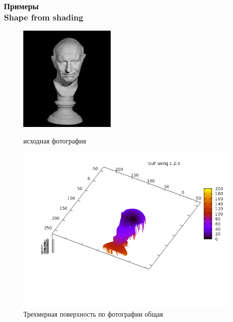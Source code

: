 \documentclass[hyperref={unicode=true},professionalfont]{beamer}
\newcommand{\stamp}{
	\begin{frame}[plain,noframenumbering]
		\begin{table}[h!]
			\flushright
			\vspace{5cm}
			\begin{adjustbox}{max width=0.7\textwidth}
				\begin{tabular}{
					|>{\footnotesize}p{0.8cm}|
					>{\footnotesize}p{0.8cm}|
					>{\footnotesize}p{2.2cm}|
					>{\footnotesize}p{1.1cm}|
					>{\footnotesize}p{0.8cm}|
					>{\footnotesize}p{5cm}|
					>{\footnotesize}p{0.1cm}|
					>{\footnotesize}p{0.1cm}|
					>{\footnotesize}p{0.1cm}|
					>{\footnotesize}p{0.8cm}|
					>{\footnotesize}p{1.4cm}|
				}
					\hline
					&&&&& \multicolumn{6}{>{\footnotesize}c|}{\multirow{3}{*}{\Large 0.043.00.00 ПЗ}} \\ \cline{1-5}
					&&&&& \multicolumn{6}{>{\footnotesize}c|}{} \\ \cline{1-5}
					Изм. & Лист & № Документа & Подпись & Дата & \multicolumn{6}{>{\footnotesize}c|}{} \\ \hline
					\multicolumn{2}{|>{\footnotesize}l|}{Разработал}
                    & Апанович Д.В. &  &  &
                                            \multirow{4}{5cm}{\centering
                                            Параллельный алгоритм
                                            численного решения
                                            анизотропного уравнения эйконала} & \multicolumn{3}{>{\footnotesize}l|}{Лит.} & Лист & Листов \\ \cline{1-5}\cline{7-11}
					\multicolumn{2}{|>{\footnotesize}l|}{Проверил}
                    & Казаков А.Л. &  &  &  & У & & & \insertframenumber & \inserttotalframenumber \\ \cline{1-5}\cline{7-11}
					\multicolumn{2}{|>{\footnotesize}l|}{Нормоконтролер}
                    & Казаков А.Л. &  &  &  & \multicolumn{5}{>{\footnotesize}l|}{} \\ \cline{1-5}
					\multicolumn{2}{|>{\footnotesize}l|}{} &  &  &  &  & \multicolumn{5}{>{\footnotesize}l|}{Кафедра АС, гр. ИСТм-16-1} \\ \cline{1-5}
					\multicolumn{2}{|>{\footnotesize}l|}{Утвердил}
                    & Бахвалов С.В. &  &  &  & \multicolumn{5}{>{\footnotesize}l|}{} \\ \hline

				\end{tabular}
			\end{adjustbox}
		\end{table}

	\end{frame}
}
\renewcommand{\stamp}{}
\begin{document}
\begin{frame}
  \frametitle{Примеры \\ Shape from shading}

  \begin{figure}[ht]
    \begin{minipage}[h]{0.49\linewidth}
      \centering
      \includegraphics[width=0.9\linewidth]{man_in.jpg}
      \hfil \caption{исходная фотография}
      \label{fig:ex:4:in}

    \end{minipage}
    \begin{minipage}[ht]{0.49\linewidth}
      \centering
      \includegraphics[width=0.9\linewidth]{man_all.png}
      \hfil \caption{Трехмерная поверхность по фотографии общая}
      \label{fig:ex:4:out1}
    \end{minipage}
  \end{figure}

\end{frame}
\stamp
\end{document}
